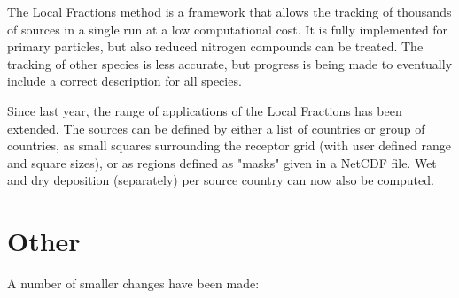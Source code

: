 The Local Fractions method \citep{wind-2020} is a framework that allows the tracking of thousands of sources in a single run at a low computational cost. It is fully implemented for primary particles, but also reduced nitrogen compounds can be treated. The tracking of other species is less accurate, but progress is being made to eventually include a correct description for all species.

Since last year, the range of applications of the Local Fractions has been extended.
The sources can be defined by either a list of countries or group of countries, as small squares surrounding the receptor grid (with user defined range and square sizes), or as regions defined as "masks" given in a NetCDF file.
Wet and dry deposition (separately) per source country can now also be computed.

\section{Other}
\label{sec:updateOther}

A number of smaller changes have been made:

